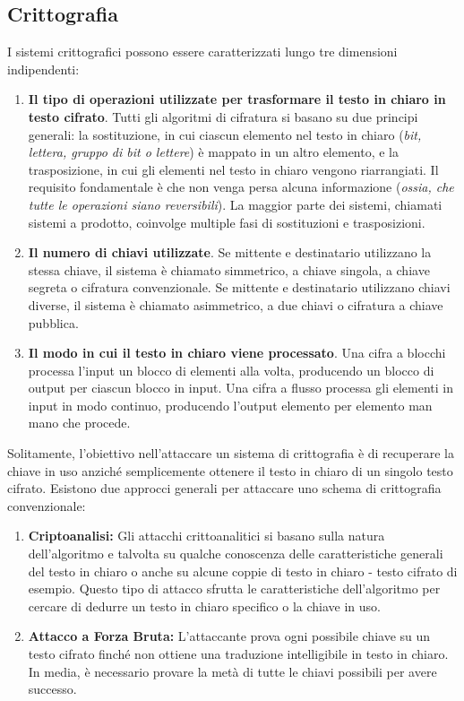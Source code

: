 \subsection{Crittografia}
I sistemi crittografici possono essere caratterizzati lungo tre dimensioni
indipendenti:
\begin{enumerate}
    \item \textbf{Il tipo di operazioni utilizzate per trasformare il testo in chiaro
    in testo cifrato}. Tutti gli algoritmi di cifratura si basano su due principi
    generali: la sostituzione, in cui ciascun elemento nel testo in 
    chiaro (\textit{bit, lettera, gruppo di bit o lettere}) è mappato
    in un altro elemento, e la trasposizione, in cui gli elementi nel
    testo in chiaro vengono riarrangiati. Il requisito fondamentale è
    che non venga persa alcuna informazione (\textit{ossia, che tutte
    le operazioni siano reversibili}). La maggior parte dei sistemi,
    chiamati sistemi a prodotto, coinvolge multiple fasi di sostituzioni
    e trasposizioni.
    \item \textbf{Il numero di chiavi utilizzate}. Se mittente e destinatario
    utilizzano la stessa chiave, il sistema è chiamato simmetrico,
    a chiave singola, a chiave segreta o cifratura convenzionale.
    Se mittente e destinatario utilizzano chiavi diverse, il sistema
    è chiamato asimmetrico, a due chiavi o cifratura a chiave pubblica.
    \item \textbf{Il modo in cui il testo in chiaro viene processato}. Una cifra
    a blocchi processa l'input un blocco di elementi alla volta, producendo
    un blocco di output per ciascun blocco in input. Una cifra a flusso
    processa gli elementi in input in modo continuo, producendo l'output
    elemento per elemento man mano che procede.
\end{enumerate}

Solitamente, l'obiettivo nell'attaccare un sistema di crittografia è di recuperare la chiave
in uso anziché semplicemente ottenere il testo in chiaro di un singolo testo cifrato. Esistono
due approcci generali per attaccare uno schema di crittografia convenzionale:

\begin{enumerate}
    \item \textbf{Criptoanalisi:} Gli attacchi crittoanalitici si basano sulla natura
    dell'algoritmo e talvolta su qualche conoscenza delle caratteristiche generali del
    testo in chiaro o anche su alcune coppie di testo in chiaro - testo cifrato di esempio.
    Questo tipo di attacco sfrutta le caratteristiche dell'algoritmo per cercare
    di dedurre un testo in chiaro specifico o la chiave in uso.
    \item \textbf{Attacco a Forza Bruta:} L'attaccante prova ogni possibile chiave su
    un testo cifrato finché non ottiene una traduzione intelligibile in testo in chiaro. In media,
    è necessario provare la metà di tutte le chiavi possibili per avere successo.
\end{enumerate}

